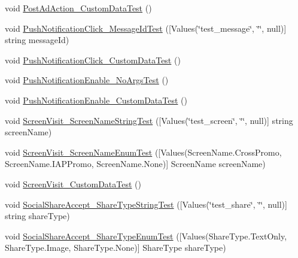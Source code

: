 \begin{DoxyCompactItemize}
\item 
void \mbox{\hyperlink{class_unity_engine_1_1_analytics_1_1_tests_1_1_analytics_event_tests_ac74c4b1bcb942be1374a77db5f781b6c}{Post\+Ad\+Action\+\_\+\+Custom\+Data\+Test}} ()
\item 
void \mbox{\hyperlink{class_unity_engine_1_1_analytics_1_1_tests_1_1_analytics_event_tests_a0f36ae744d7cc8b642461df00f0cfcad}{Push\+Notification\+Click\+\_\+\+Message\+Id\+Test}} (\mbox{[}Values(\char`\"{}test\+\_\+message\char`\"{}, \char`\"{}\char`\"{}, null)\mbox{]} string message\+Id)
\item 
void \mbox{\hyperlink{class_unity_engine_1_1_analytics_1_1_tests_1_1_analytics_event_tests_a3fc434f9dae8787bfe27e66e3fae368a}{Push\+Notification\+Click\+\_\+\+Custom\+Data\+Test}} ()
\item 
void \mbox{\hyperlink{class_unity_engine_1_1_analytics_1_1_tests_1_1_analytics_event_tests_ae06c178afc2bb7019b573bdf3ee55824}{Push\+Notification\+Enable\+\_\+\+No\+Args\+Test}} ()
\item 
void \mbox{\hyperlink{class_unity_engine_1_1_analytics_1_1_tests_1_1_analytics_event_tests_ad8e25c892a65f5d0df59e1717165ff7c}{Push\+Notification\+Enable\+\_\+\+Custom\+Data\+Test}} ()
\item 
void \mbox{\hyperlink{class_unity_engine_1_1_analytics_1_1_tests_1_1_analytics_event_tests_a8181fffd8e67dc5bfd0b77346a6a44a0}{Screen\+Visit\+\_\+\+Screen\+Name\+String\+Test}} (\mbox{[}Values(\char`\"{}test\+\_\+screen\char`\"{}, \char`\"{}\char`\"{}, null)\mbox{]} string screen\+Name)
\item 
void \mbox{\hyperlink{class_unity_engine_1_1_analytics_1_1_tests_1_1_analytics_event_tests_a80af74520b6d168988f156dcc8731daf}{Screen\+Visit\+\_\+\+Screen\+Name\+Enum\+Test}} (\mbox{[}Values(Screen\+Name.\+Cross\+Promo, Screen\+Name.\+I\+A\+P\+Promo, Screen\+Name.\+None)\mbox{]} Screen\+Name screen\+Name)
\item 
void \mbox{\hyperlink{class_unity_engine_1_1_analytics_1_1_tests_1_1_analytics_event_tests_ac07f8c1b5537f83d1570696ab711b098}{Screen\+Visit\+\_\+\+Custom\+Data\+Test}} ()
\item 
void \mbox{\hyperlink{class_unity_engine_1_1_analytics_1_1_tests_1_1_analytics_event_tests_a52fe28dafd07d68ac13b436bfe772471}{Social\+Share\+Accept\+\_\+\+Share\+Type\+String\+Test}} (\mbox{[}Values(\char`\"{}test\+\_\+share\char`\"{}, \char`\"{}\char`\"{}, null)\mbox{]} string share\+Type)
\item 
void \mbox{\hyperlink{class_unity_engine_1_1_analytics_1_1_tests_1_1_analytics_event_tests_ab4c89ef79ccf1e226f8143a13f06c186}{Social\+Share\+Accept\+\_\+\+Share\+Type\+Enum\+Test}} (\mbox{[}Values(Share\+Type.\+Text\+Only, Share\+Type.\+Image, Share\+Type.\+None)\mbox{]} Share\+Type share\+Type)

\end{DoxyCompactItemize}
